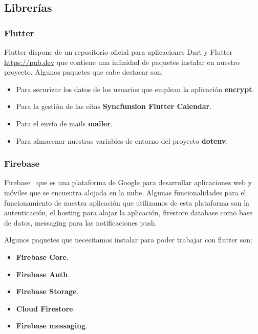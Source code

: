 \subsection{Librerías}

\subsubsection{Flutter}
Flutter dispone de un repositorio oficial para aplicaciones Dart y Flutter  \url{https://pub.dev} que contiene una infinidad de paquetes instalar en nuestro proyecto. 
Algunos paquetes que cabe destacar son:

\begin{itemize}
	\item Para securizar los datos de los usuarios que emplean la aplicación \textbf{encrypt}.
	\item Para la gestión de las citas \textbf{Syncfunsion Flutter Calendar}.
	\item Para el envío de mails \textbf{mailer}.
	\item Para almacenar nuestras variables de entorno del proyecto \textbf{dotenv}.
\end{itemize}

\subsubsection{Firebase}
Firebase~\cite{firebase} que es una plataforma de Google para desarrollar aplicaciones web y móviles que se encuentra alojada en la nube. Algunas funcionalidades para el funcionamiento de nuestra aplicación que utilizamos de esta plataforma son la autenticación, el hosting para alojar la aplicación, firestore database como base de datos, messaging para las notificaciones push.

Algunos paquetes que necesitamos instalar para poder trabajar con flutter son:
\begin{itemize}
	\item \textbf{Firebase Core}.
	\item \textbf{Firebase Auth}.
	\item \textbf{Firebase Storage}.
	\item \textbf{Cloud Firestore}.
	\item \textbf{Firebase messaging}.
\end{itemize}




